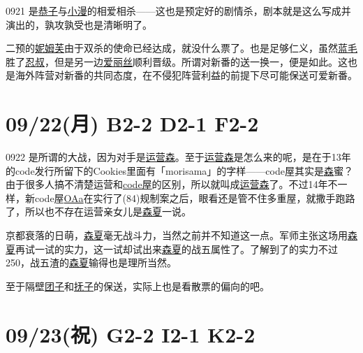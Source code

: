 0921 是\uline{恭子}与\uline{小漫}的相爱相杀——这也是预定好的剧情杀，剧本就是这么写成并演出的，孰攻孰受也是清晰明了。

二预的\uline{妮姆芙}由于双杀的使命已经达成，就没什么票了。也是足够仁义，虽然\uline{蓝毛}胜了\uline{忍叔}，但是另一边\uline{爱丽丝}顺利晋级。所谓对新番的送一换一，便是如此。这也是海外阵营对新番的共同态度，在不侵犯阵营利益的前提下尽可能保送可爱新番。

\section{09/22(月) B2-2 D2-1 F2-2}


0922 是所谓的大战，因为对手是\uline{运营森}。至于\uline{运营森}是怎么来的呢，是在于13年的code发行所留下的Cookies里面有「morisama」的字样——code屋其实是\uline{森}蜜？由于很多人搞不清楚运营和\uline{code屋}的区别，所以就叫成\uline{运营森}了。不过14年不一样，新code屋\uline{OAa}在实行了(84)规制案之后，眼看还是管不住多重屋，就撒手跑路了，所以也不存在运营亲女儿是\uline{森夏}一说。

京都衰落的日萌，\uline{森夏}毫无战斗力，当然之前并不知道这一点。军师主张这场用\uline{森夏}再试一试的实力，这一试却试出来\uline{森夏}的战五属性了。了解到了的实力不过250，战五渣的\uline{森夏}输得也是理所当然。

至于隔壁\uline{团子}和\uline{抚子}的保送，实际上也是看散票的偏向的吧。

\section{09/23(祝) G2-2 I2-1 K2-2}


